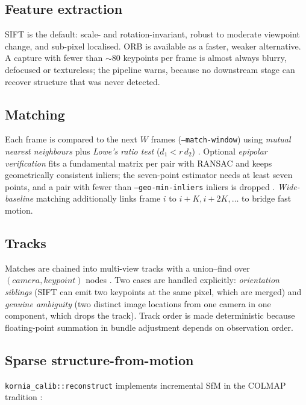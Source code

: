 \documentclass[11pt,a4paper]{article}
\newcommand{\code}[1]{\texttt{#1}}
\begin{document}
\subsection{Feature extraction}
\label{sec:features}

SIFT \cite{lowe2004} is the default: scale- and rotation-invariant, robust to moderate
viewpoint change, and sub-pixel localised. ORB \cite{rublee2011} is available as a faster,
weaker alternative. A capture with fewer than $\sim$80 keypoints per frame is almost always
blurry, defocused or textureless; the pipeline warns, because no downstream stage can recover
structure that was never detected.

\subsection{Matching}
\label{sec:matching}

Each frame is compared to the next $W$ frames (\code{--match-window}) using \emph{mutual
nearest neighbours} plus \emph{Lowe's ratio test} ($d_1 < r\,d_2$) \cite{lowe2004}. Optional
\emph{epipolar verification} fits a fundamental matrix per pair with RANSAC
\cite{fischler1981} and keeps geometrically consistent inliers; the seven-point estimator
needs at least seven points, and a pair with fewer than \code{--geo-min-inliers} inliers is
dropped \cite{hartley2004}. \emph{Wide-baseline} matching additionally links frame $i$ to
$i+K, i+2K, \ldots$ to bridge fast motion.

\subsection{Tracks}
\label{sec:tracks}

Matches are chained into multi-view tracks with a union--find over $(camera, keypoint)$ nodes
\cite{schonberger2016}. Two cases are handled explicitly: \emph{orientation siblings} (SIFT can
emit two keypoints at the same pixel, which are merged) and \emph{genuine ambiguity} (two
distinct image locations from one camera in one component, which drops the track). Track order
is made deterministic because floating-point summation in bundle adjustment depends on
observation order.

\subsection{Sparse structure-from-motion}
\label{sec:sfm}

\code{kornia\_calib::reconstruct} implements incremental SfM in the COLMAP tradition
\cite{schonberger2016}:
\end{document}
